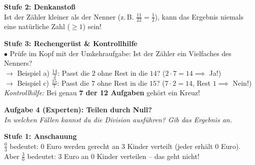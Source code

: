 \documentclass[a4paper, 10pt]{article}
\begin{document}
\begin{tcolorbox}[colback=step2Bg, colframe=step2Border, arc=1.8mm, boxrule=0.7pt, left=3mm, right=3mm, top=1.8mm, bottom=1.8mm]
    {\color{step2Text}\small\bfseries\faLightbulb\enskip Stufe 2: Denkanstoß}\\[1mm]
    {\footnotesize Ist der Zähler kleiner als der Nenner (z.\,B. $\frac{11}{22} = \frac{1}{2}$), kann das Ergebnis niemals eine natürliche Zahl ($\ge 1$) sein!}
\end{tcolorbox}

\begin{tcolorbox}[colback=step3Bg, colframe=step3Border, arc=1.8mm, boxrule=0.7pt, left=3mm, right=3mm, top=1.8mm, bottom=1.8mm]
    {\color{step3Text}\small\bfseries\faCheckSquare\enskip Stufe 3: Rechengerüst \& Kontrollhilfe}\\[1mm]
    {\footnotesize
    $\bullet$ Prüfe im Kopf mit der Umkehraufgabe: Ist der Zähler ein Vielfaches des Nenners?\\
    $\to$ Beispiel a) $\frac{14}{2}$: Passt die $2$ ohne Rest in die $14$? ($2 \cdot 7 = 14 \implies$ Ja!)\\[0.5mm]
    $\to$ Beispiel c) $\frac{15}{7}$: Passt die $7$ ohne Rest in die $15$? ($7 \cdot 2 = 14$, Rest $1 \implies$ Nein!)\\[0.5mm]
    \textit{Kontrollhilfe:} Bei genau \textbf{7 der 12 Aufgaben} gehört ein Kreuz!
    }
\end{tcolorbox}

\vspace{3.5mm}

\begin{tcolorbox}[enhanced, colback=lvlPurple!5, colframe=lvlPurple!60, arc=2mm, boxrule=0.8pt, left=3mm, right=3mm, top=2mm, bottom=2mm]
    {\bfseries\color{lvlPurple} \faExclamationTriangle\enskip Aufgabe 4 (Experten): Teilen durch Null?}\\[1mm]
    {\footnotesize\textit{In welchen Fällen kannst du die Division ausführen? Gib das Ergebnis an.}}
\end{tcolorbox}

\vspace{1.2mm}

\begin{tcolorbox}[colback=step1Bg, colframe=step1Border, arc=1.8mm, boxrule=0.7pt, left=3mm, right=3mm, top=1.8mm, bottom=1.8mm]
    {\color{step1Text}\small\bfseries\faEye\enskip Stufe 1: Anschauung}\\[1mm]
    {\footnotesize $\frac{0}{3}$ bedeutet: $0$ Euro werden gerecht an $3$ Kinder verteilt (jeder erhält $0$ Euro). Aber $\frac{3}{0}$ bedeutet: $3$ Euro an $0$ Kinder verteilen – das geht nicht!}
\end{tcolorbox}
\end{document}
